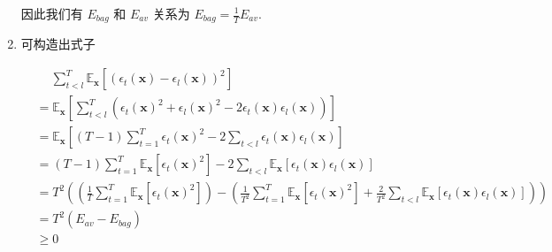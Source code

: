 \documentclass[answers]{exam}  %
\begin{document}
\begin{questions}
\begin{solution}
\begin{enumerate}
            因此我们有 $E_{bag}$ 和 $E_{av}$ 关系为 $\displaystyle E_{bag} = \frac{1}{T}E_{av}$.

      \item

            可构造出式子

            $$
              \begin{aligned}
                 & \quad\ \sum_{t < l}^{T}\mathbb{E}_{\bm{x}}[(\epsilon_{t}(\bm{x})-\epsilon_{l}(\bm{x}))^{2}]                                                                                                                                                                 \\
                 & = \mathbb{E}_{\bm{x}}[\sum_{t < l}^{T}(\epsilon_{t}(\bm{x})^{2}+\epsilon_{l}(\bm{x})^{2} - 2\epsilon_{t}(\bm{x})\epsilon_{l}(\bm{x}))]                                                                                                                      \\
                 & = \mathbb{E}_{\bm{x}}[(T-1)\sum_{t=1}^{T}\epsilon_{t}(\bm{x})^{2} - 2\sum_{t < l}\epsilon_{t}(\bm{x})\epsilon_{l}(\bm{x})]                                                                                                                                  \\
                 & = (T-1)\sum_{t=1}^{T}\mathbb{E}_{\bm{x}}[\epsilon_{t}(\bm{x})^{2}] - 2\sum_{t < l}\mathbb{E}_{\bm{x}}[\epsilon_{t}(\bm{x})\epsilon_{l}(\bm{x})]                                                                                                             \\
                 & = T^{2}((\frac{1}{T}\sum_{t=1}^{T}\mathbb{E}_{\bm{x}}[\epsilon_{t}(\bm{x})^{2}]) - (\frac{1}{T^{2}}\sum_{t=1}^{T}\mathbb{E}_{\bm{x}}[\epsilon_{t}(\bm{x})^{2}] + \frac{2}{T^{2}}\sum_{t < l}\mathbb{E}_{\bm{x}}[\epsilon_{t}(\bm{x})\epsilon_{l}(\bm{x})])) \\
                 & = T^{2}(E_{av} - E_{bag})                                                                                                                                                                                                                                   \\
                 & \ge 0                                                                                                                                                                                                                                                       \\
              \end{aligned}
            $$


\end{enumerate}
\end{solution}
\end{questions}
\end{document}
